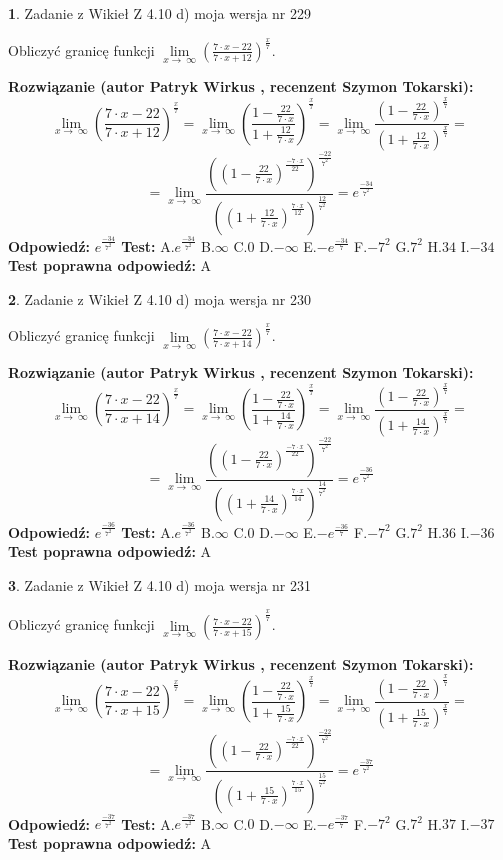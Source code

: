 \documentclass[12pt, a4paper]{article}
\theoremstyle{definition} %
\newtheorem{zad}{}
\newcommand{\zadStart}[1]{\begin{zad}#1\newline}
\newcommand{\zadStop}{\end{zad}}
\newcommand{\rozwStart}[2]{\noindent \textbf{Rozwiązanie (autor #1 , recenzent #2): }\newline}
\newcommand{\rozwStop}{\newline}
\newcommand{\odpStart}{\noindent \textbf{Odpowiedź:}\newline}
\newcommand{\odpStop}{\newline}
\newcommand{\testStart}{\noindent \textbf{Test:}\newline}
\newcommand{\testStop}{\newline}
\newcommand{\kluczStart}{\noindent \textbf{Test poprawna odpowiedź:}\newline}
\newcommand{\kluczStop}{\newline}
\begin{document}
\zadStart{Zadanie z Wikieł Z 4.10 d) moja wersja nr 229}


Obliczyć granicę funkcji  $\lim\limits_{x\to\ \infty}(\frac{7\cdot x-22}{7\cdot x+12})^{\frac{x}{7}}$.
\zadStop
\rozwStart{Patryk Wirkus}{Szymon Tokarski}
$$\lim\limits_{x\to\ \infty}(\frac{7\cdot x-22}{7\cdot x+12})^{\frac{x}{7}} = \lim\limits_{x\to\ \infty}(\frac{1-\frac{22}{7\cdot x}}{1+\frac{12}{7\cdot x}})^{\frac{x}{7}}=\lim\limits_{x\to\ \infty}\frac{(1-\frac{22}{7\cdot x})^{\frac{x}{7}}}{(1+\frac{12}{7\cdot x})^{\frac{x}{7}}}=$$
$$=\lim\limits_{x\to\ \infty}\frac{((1-\frac{22}{7\cdot x})^{\frac{-7\cdot x}{22}})^{\frac{-22}{7^{2}}}}{((1+\frac{12}{7\cdot x})^{\frac{7\cdot x}{12}})^{\frac{12}{7^{2}}}}=e^{\frac{-34}{7^{2}}}$$
\rozwStop
\odpStart
$e^{\frac{-34}{7^{2}}}$
\odpStop
\testStart
A.$e^{\frac{-34}{7^{2}}}$ B.$\infty$ C.$0$ D.$-\infty$ E.$-e^{\frac{-34}{7}}$
F.$-7^{2}$ G.$7^{2}$
H.$34$
I.$-34$
\testStop
\kluczStart
A
\kluczStop



\zadStart{Zadanie z Wikieł Z 4.10 d) moja wersja nr 230}


Obliczyć granicę funkcji  $\lim\limits_{x\to\ \infty}(\frac{7\cdot x-22}{7\cdot x+14})^{\frac{x}{7}}$.
\zadStop
\rozwStart{Patryk Wirkus}{Szymon Tokarski}
$$\lim\limits_{x\to\ \infty}(\frac{7\cdot x-22}{7\cdot x+14})^{\frac{x}{7}} = \lim\limits_{x\to\ \infty}(\frac{1-\frac{22}{7\cdot x}}{1+\frac{14}{7\cdot x}})^{\frac{x}{7}}=\lim\limits_{x\to\ \infty}\frac{(1-\frac{22}{7\cdot x})^{\frac{x}{7}}}{(1+\frac{14}{7\cdot x})^{\frac{x}{7}}}=$$
$$=\lim\limits_{x\to\ \infty}\frac{((1-\frac{22}{7\cdot x})^{\frac{-7\cdot x}{22}})^{\frac{-22}{7^{2}}}}{((1+\frac{14}{7\cdot x})^{\frac{7\cdot x}{14}})^{\frac{14}{7^{2}}}}=e^{\frac{-36}{7^{2}}}$$
\rozwStop
\odpStart
$e^{\frac{-36}{7^{2}}}$
\odpStop
\testStart
A.$e^{\frac{-36}{7^{2}}}$ B.$\infty$ C.$0$ D.$-\infty$ E.$-e^{\frac{-36}{7}}$
F.$-7^{2}$ G.$7^{2}$
H.$36$
I.$-36$
\testStop
\kluczStart
A
\kluczStop



\zadStart{Zadanie z Wikieł Z 4.10 d) moja wersja nr 231}


Obliczyć granicę funkcji  $\lim\limits_{x\to\ \infty}(\frac{7\cdot x-22}{7\cdot x+15})^{\frac{x}{7}}$.
\zadStop
\rozwStart{Patryk Wirkus}{Szymon Tokarski}
$$\lim\limits_{x\to\ \infty}(\frac{7\cdot x-22}{7\cdot x+15})^{\frac{x}{7}} = \lim\limits_{x\to\ \infty}(\frac{1-\frac{22}{7\cdot x}}{1+\frac{15}{7\cdot x}})^{\frac{x}{7}}=\lim\limits_{x\to\ \infty}\frac{(1-\frac{22}{7\cdot x})^{\frac{x}{7}}}{(1+\frac{15}{7\cdot x})^{\frac{x}{7}}}=$$
$$=\lim\limits_{x\to\ \infty}\frac{((1-\frac{22}{7\cdot x})^{\frac{-7\cdot x}{22}})^{\frac{-22}{7^{2}}}}{((1+\frac{15}{7\cdot x})^{\frac{7\cdot x}{15}})^{\frac{15}{7^{2}}}}=e^{\frac{-37}{7^{2}}}$$
\rozwStop
\odpStart
$e^{\frac{-37}{7^{2}}}$
\odpStop
\testStart
A.$e^{\frac{-37}{7^{2}}}$ B.$\infty$ C.$0$ D.$-\infty$ E.$-e^{\frac{-37}{7}}$
F.$-7^{2}$ G.$7^{2}$
H.$37$
I.$-37$
\testStop
\kluczStart
A
\kluczStop
\end{document}
